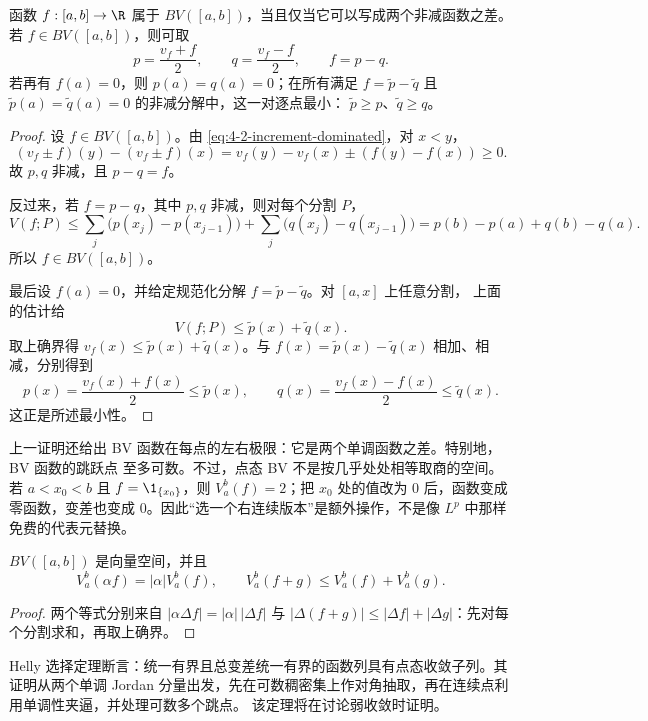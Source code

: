 \begin{theorem}\label{theorem:4-2-1-2}
函数 $f:[a,b]\to\R$ 属于 $BV([a,b])$，当且仅当它可以写成两个非减函数之差。
若 $f\in BV([a,b])$，则可取
\[
 p=\frac{v_f+f}{2},\qquad q=\frac{v_f-f}{2},\qquad f=p-q.
\]
若再有 $f(a)=0$，则 $p(a)=q(a)=0$；在所有满足
$f=\widetilde p-\widetilde q$ 且
$\widetilde p(a)=\widetilde q(a)=0$ 的非减分解中，这一对逐点最小：
$\widetilde p\ge p$、$\widetilde q\ge q$。
\end{theorem}

\begin{proof}
设 $f\in BV([a,b])$。由 \eqref{eq:4-2-increment-dominated}，对 $x<y$，
\[
 (v_f\pm f)(y)-(v_f\pm f)(x)
 =v_f(y)-v_f(x)\pm(f(y)-f(x))\ge0.
\]
故 $p,q$ 非减，且 $p-q=f$。

反过来，若 $f=p-q$，其中 $p,q$ 非减，则对每个分割 $P$，
\[
 V(f;P)
 \le\sum_j\bigl(p(x_j)-p(x_{j-1})\bigr)
   +\sum_j\bigl(q(x_j)-q(x_{j-1})\bigr)
 =p(b)-p(a)+q(b)-q(a).
\]
所以 $f\in BV([a,b])$。

最后设 $f(a)=0$，并给定规范化分解 $f=\widetilde p-\widetilde q$。对 $[a,x]$ 上任意分割，
上面的估计给
\[
 V(f;P)\le \widetilde p(x)+\widetilde q(x).
\]
取上确界得 $v_f(x)\le\widetilde p(x)+\widetilde q(x)$。与
$f(x)=\widetilde p(x)-\widetilde q(x)$ 相加、相减，分别得到
\[
 p(x)=\frac{v_f(x)+f(x)}2\le\widetilde p(x),\qquad
 q(x)=\frac{v_f(x)-f(x)}2\le\widetilde q(x).
\]
这正是所述最小性。
\end{proof}

上一证明还给出 BV 函数在每点的左右极限：它是两个单调函数之差。特别地，BV 函数的跳跃点
至多可数。不过，点态 BV 不是按几乎处处相等取商的空间。若 $a<x_0<b$ 且
$f=\1_{\{x_0\}}$，则 $V_a^b(f)=2$；把 $x_0$ 处的值改为 $0$ 后，函数变成零函数，变差也变成
$0$。因此“选一个右连续版本”是额外操作，不是像 $L^p$ 中那样免费的代表元替换。

\begin{proposition}[BV 的代数性质]\label{proposition:4-2-1-3}
$BV([a,b])$ 是向量空间，并且
\[
 V_a^b(\alpha f)=|\alpha|V_a^b(f),\qquad
 V_a^b(f+g)\le V_a^b(f)+V_a^b(g).
\]
\end{proposition}

\begin{proof}
两个等式分别来自
$|\alpha\Delta f|=|\alpha|\,|\Delta f|$ 与
$|\Delta(f+g)|\le|\Delta f|+|\Delta g|$：先对每个分割求和，再取上确界。
\end{proof}

Helly 选择定理断言：统一有界且总变差统一有界的函数列具有点态收敛子列。其证明从两个单调
Jordan 分量出发，先在可数稠密集上作对角抽取，再在连续点利用单调性夹逼，并处理可数多个跳点。
该定理将在讨论弱收敛时证明。

